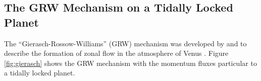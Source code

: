 
%





\subsection{The GRW Mechanism on a Tidally Locked Planet}\label{sec:grw-on-tl}


The ``Gierasch-Rossow-Williams'' (GRW) mechanism was developed by \citet{gierasch1975meridional} and \citet{rossow1979large} to describe the formation of zonal flow in the atmosphere of Venus \citep{read2018superrotation}. Figure \ref{fig:gierasch} shows the GRW mechanism with the momentum fluxes particular to a tidally locked planet.
%

